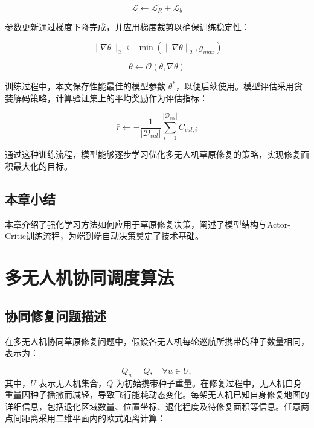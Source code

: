 \documentclass[AutoFakeBold]{LZUThesis}
\begin{document}
\begin{equation}
	\mathcal{L} \leftarrow \mathcal{L}_{R} + \mathcal{L}_{b}
\end{equation}

参数更新通过梯度下降完成，并应用梯度裁剪以确保训练稳定性：

\begin{equation}
	\|\nabla\theta\|_2 \leftarrow \min(\|\nabla\theta\|_2, g_{max})
\end{equation}

\begin{equation}
	\theta \leftarrow \mathcal{O}(\theta, \nabla\theta)
\end{equation}

训练过程中，本文保存性能最佳的模型参数 $\theta^*$，以便后续使用。模型评估采用贪婪解码策略，计算验证集上的平均奖励作为评估指标：

\begin{equation}
	\bar{r} \leftarrow -\frac{1}{|\mathcal{D}_{val}|}\sum_{i=1}^{|\mathcal{D}_{val}|} C_{val,i}
\end{equation}

通过这种训练流程，模型能够逐步学习优化多无人机草原修复的策略，实现修复面积最大化的目标。

\section{本章小结}
本章介绍了强化学习方法如何应用于草原修复决策，阐述了模型结构与Actor-Critic训练流程，为端到端自动决策奠定了技术基础。

\chapter{多无人机协同调度算法}

\section{协同修复问题描述}

在多无人机协同草原修复问题中，假设各无人机每轮巡航所携带的种子数量相同，表示为：

\begin{equation}
	Q_u = Q, \quad \forall u \in U,
\end{equation}
其中，$U$ 表示无人机集合，$Q$ 为初始携带种子重量。在修复过程中，无人机自身重量因种子播撒而减轻，导致飞行能耗动态变化。每架无人机已知自身修复地图的详细信息，包括退化区域数量、位置坐标、退化程度及待修复面积等信息。任意两点间距离采用二维平面内的欧式距离计算：
\end{document}
